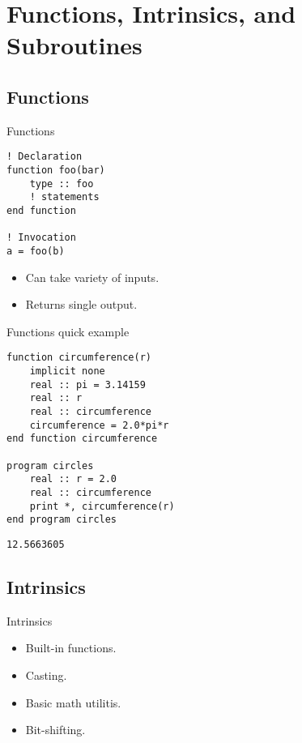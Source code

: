 \section[Functions]{Functions, Intrinsics, and Subroutines}
\makesubcontentsslides



\subsection{Functions}

\begin{frame}[fragile]
  \begin{block}{Functions}\pause
\begin{lstlisting}
! Declaration
function foo(bar)
    type :: foo
    ! statements
end function

! Invocation
a = foo(b)
\end{lstlisting}
  \begin{itemize}
    \item Can take variety of inputs.
    \item Returns single output.
  \end{itemize}
  \end{block}
\end{frame}

\begin{frame}[fragile]
  \begin{block}{Functions quick example}\pause
\begin{lstlisting}
function circumference(r)
    implicit none
    real :: pi = 3.14159
    real :: r
    real :: circumference
    circumference = 2.0*pi*r
end function circumference

program circles
    real :: r = 2.0
    real :: circumference
    print *, circumference(r)
end program circles
\end{lstlisting}
\begin{lstlisting}[language=shl]
   12.5663605  
\end{lstlisting}
  \end{block}
\end{frame}


\subsection{Intrinsics}

\begin{frame}
  \begin{block}{Intrinsics}\pause
  \begin{itemize}
    \item Built-in functions.
    \item Casting.
    \item Basic math utilitis.
    \item Bit-shifting.
  \end{itemize}
  \end{block}
\end{frame}

